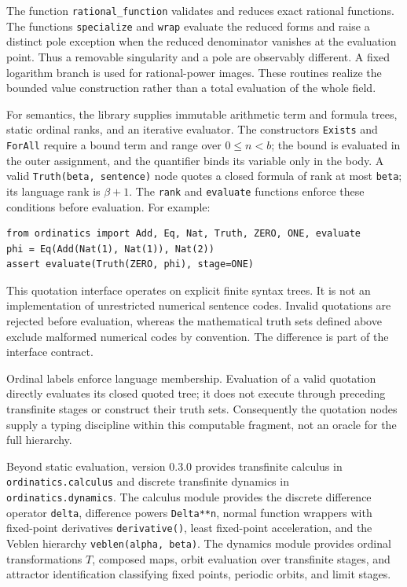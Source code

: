 \documentclass[11pt]{article}
\theoremstyle{definition}
\begin{document}
The function \texttt{rational\_function} validates and reduces exact rational functions. The functions \texttt{specialize} and \texttt{wrap} evaluate the reduced forms and raise a distinct pole exception when the reduced denominator vanishes at the evaluation point. Thus a removable singularity and a pole are observably different. A fixed logarithm branch is used for rational-power images. These routines realize the bounded value construction rather than a total evaluation of the whole field.

For semantics, the library supplies immutable arithmetic term and formula trees, static ordinal ranks, and an iterative evaluator. The constructors \texttt{Exists} and \texttt{ForAll} require a bound term and range over $0\le n<b$; the bound is evaluated in the outer assignment, and the quantifier binds its variable only in the body. A valid \texttt{Truth(beta, sentence)} node quotes a closed formula of rank at most \texttt{beta}; its language rank is $\beta+1$. The \texttt{rank} and \texttt{evaluate} functions enforce these conditions before evaluation. For example:
\begin{verbatim}
from ordinatics import Add, Eq, Nat, Truth, ZERO, ONE, evaluate
phi = Eq(Add(Nat(1), Nat(1)), Nat(2))
assert evaluate(Truth(ZERO, phi), stage=ONE)
\end{verbatim}
This quotation interface operates on explicit finite syntax trees. It is not an implementation of unrestricted numerical sentence codes. Invalid quotations are rejected before evaluation, whereas the mathematical truth sets defined above exclude malformed numerical codes by convention. The difference is part of the interface contract.

Ordinal labels enforce language membership. Evaluation of a valid quotation directly evaluates its closed quoted tree; it does not execute through preceding transfinite stages or construct their truth sets. Consequently the quotation nodes supply a typing discipline within this computable fragment, not an oracle for the full hierarchy.

Beyond static evaluation, version 0.3.0 provides transfinite calculus in \texttt{ordinatics.calculus} and discrete transfinite dynamics in \texttt{ordinatics.dynamics}. The calculus module provides the discrete difference operator \texttt{delta}, difference powers \texttt{Delta**n}, normal function wrappers with fixed-point derivatives \texttt{derivative()}, least fixed-point acceleration, and the Veblen hierarchy \texttt{veblen(alpha, beta)}. The dynamics module provides ordinal transformations $T$, composed maps, orbit evaluation over transfinite stages, and attractor identification classifying fixed points, periodic orbits, and limit stages.
\end{document}
